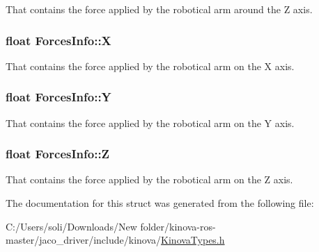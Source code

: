 That contains the force applied by the robotical arm around the Z axis. 

\subsubsection[{\texorpdfstring{X}{X}}]{\setlength{\rightskip}{0pt plus 5cm}float Forces\+Info\+::X}\hypertarget{struct_forces_info_abda609c2b6bfa10a6925f6dc4563d3b1}{}\label{struct_forces_info_abda609c2b6bfa10a6925f6dc4563d3b1}


That contains the force applied by the robotical arm on the X axis. 

\subsubsection[{\texorpdfstring{Y}{Y}}]{\setlength{\rightskip}{0pt plus 5cm}float Forces\+Info\+::Y}\hypertarget{struct_forces_info_a47c77e75fa6c73fafe28ac2a82e6ac96}{}\label{struct_forces_info_a47c77e75fa6c73fafe28ac2a82e6ac96}


That contains the force applied by the robotical arm on the Y axis. 

\subsubsection[{\texorpdfstring{Z}{Z}}]{\setlength{\rightskip}{0pt plus 5cm}float Forces\+Info\+::Z}\hypertarget{struct_forces_info_a271af36e068276a370351c1ebe8ce911}{}\label{struct_forces_info_a271af36e068276a370351c1ebe8ce911}


That contains the force applied by the robotical arm on the Z axis. 



The documentation for this struct was generated from the following file\+:\begin{DoxyCompactItemize}
\item 
C\+:/\+Users/soli/\+Downloads/\+New folder/kinova-\/ros-\/master/jaco\+\_\+driver/include/kinova/\hyperlink{_kinova_types_8h}{Kinova\+Types.\+h}\end{DoxyCompactItemize}
